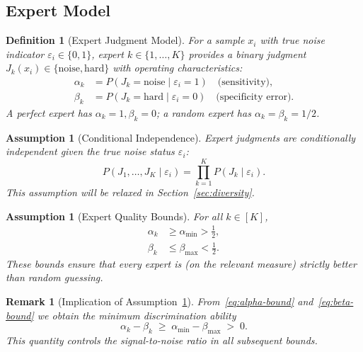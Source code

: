 \documentclass[12pt,a4paper]{article}
\newtheorem{definition}[theorem]{Definition}
\newtheorem{remark}[theorem]{Remark}
\newtheorem{assumption}[theorem]{Assumption}
\begin{document}
\subsection{Expert Model}

\begin{definition}[Expert Judgment Model]
\label{def:expert}
For a sample $x_i$ with true noise indicator $\varepsilon_i\in\{0,1\}$, expert
$k\in\{1,\dots,K\}$ provides a binary judgment
$J_k(x_i)\in\{\mathrm{noise},\mathrm{hard}\}$ with operating characteristics:
\begin{align}
    \alpha_k &= P(J_k=\mathrm{noise}\mid\varepsilon_i=1)
               \quad\text{(sensitivity)}, \label{eq:alpha}\\
    \beta_k  &= P(J_k=\mathrm{hard}\mid\varepsilon_i=0)
               \quad\text{(specificity error)}. \label{eq:beta}
\end{align}
A perfect expert has $\alpha_k=1,\beta_k=0$; a random expert has
$\alpha_k=\beta_k=1/2$.
\end{definition}

\begin{assumption}[Conditional Independence]
\label{ass:independence}
Expert judgments are conditionally independent given the true noise status
$\varepsilon_i$:
\begin{equation}\label{eq:cond-indep}
    P(J_1,\dots,J_K\mid\varepsilon_i) =
    \prod_{k=1}^K P(J_k\mid\varepsilon_i).
\end{equation}
This assumption will be relaxed in Section~\ref{sec:diversity}.
\end{assumption}

\begin{assumption}[Expert Quality Bounds]
\label{ass:quality}
For all $k\in[K]$,
\begin{align}
    \alpha_k &\geq \alpha_{\min} > \tfrac12, \label{eq:alpha-bound}\\
    \beta_k  &\leq \beta_{\max}  < \tfrac12. \label{eq:beta-bound}
\end{align}
These bounds ensure that every expert is (on the relevant measure) strictly
better than random guessing.
\end{assumption}

\begin{remark}[Implication of Assumption~\ref{ass:quality}]
\label{rem:gap}
From~\eqref{eq:alpha-bound} and~\eqref{eq:beta-bound} we obtain the minimum
discrimination ability
\begin{equation}\label{eq:min-gap}
    \alpha_k - \beta_k \;\geq\; \alpha_{\min} - \beta_{\max} \;>\; 0.
\end{equation}
This quantity controls the signal-to-noise ratio in all subsequent bounds.
\end{remark}
\end{document}
